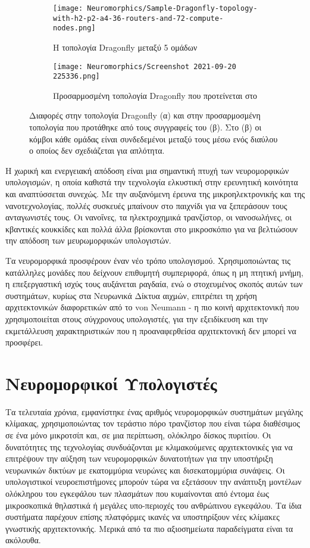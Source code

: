 \documentclass[12pt]{report}
\begin{document}
\begin{figure}
\centering
\begin{subfigure}{.4\textwidth}
  \centering
  \texttt{[image: Neuromorphics/Sample-Dragonfly-topology-with-h2-p2-a4-36-routers-and-72-compute-nodes.png]}
  \caption{Η τοπολογία Dragonfly μεταξύ 5 ομάδων}
  \label{fig:sub1}
\end{subfigure}%
\begin{subfigure}{.6\textwidth}
  \centering
  \texttt{[image: Neuromorphics/Screenshot 2021-09-20 225336.png]}
  \caption{Προσαρμοσμένη τοπολογία Dragonfly που προτείνεται στο \cite{Akbari2017}}
  \label{fig:sub2}
\end{subfigure}
\caption{\small Διαφορές στην τοπολογία Dragonfly (α) και στην προσαρμοσμένη τοπολογία που προτάθηκε από τους συγγραφείς του \cite{Akbari2017} (β). Στο (β) οι κόμβοι κάθε ομάδας είναι συνδεδεμένοι μεταξύ τους μέσω ενός διαύλου ο οποίος δεν σχεδιάζεται για απλότητα.}
\label{fig:test}
\end{figure}


Η χωρική και ενεργειακή απόδοση είναι μια σημαντική πτυχή των νευρομορφικών υπολογισμών, η οποία καθιστά την τεχνολογία ελκυστική στην ερευνητική κοινότητα και αναπτύσσεται συνεχώς. Με την αυξανόμενη έρευνα της μικροηλεκτρονικής και της νανοτεχνολογίας, πολλές συσκευές μπαίνουν στο παιχνίδι για να ξεπεράσουν τους ανταγωνιστές τους. Οι νανοΐνες, τα ηλεκτροχημικά τρανζίστορ, οι νανοσωλήνες, οι κβαντικές κουκκίδες και πολλά άλλα βρίσκονται στο μικροσκόπιο για να βελτιώσουν την απόδοση των μευρωμορφικών υπολογιστών.

Τα νευρομορφικά προσφέρουν έναν νέο τρόπο υπολογισμού. Χρησιμοποιώντας τις κατάλληλες μονάδες που δείχνουν επιθυμητή συμπεριφορά, όπως η μη πτητική μνήμη, η επεξεργαστική ισχύς τους αυξάνεται ραγδαία, ενώ ο στοχευμένος σκοπός αυτών των συστημάτων, κυρίως στα Νευρωνικά Δίκτυα αιχμών, επιτρέπει τη χρήση αρχιτεκτονικών διαφορετικών από το \textlatin{von Neumann}  - η πιο κοινή αρχιτεκτονική που χρησιμοποιείται στους σύγχρονους υπολογιστές, για την εξειδίκευση και την εκμετάλλευση χαρακτηριστικών που η προαναφερθείσα αρχιτεκτονική δεν μπορεί να προσφέρει.

\section{Νευρομορφικοί Υπολογιστές}

Τα τελευταία χρόνια, εμφανίστηκε ένας αριθμός νευρομορφικών συστημάτων μεγάλης κλίμακας, χρησιμοποιώντας τον τεράστιο πόρο τρανζίστορ που είναι τώρα διαθέσιμος σε ένα μόνο μικροτσίπ και, σε μια περίπτωση, ολόκληρο δίσκος πυριτίου. Οι δυνατότητες της τεχνολογίας συνδυάζονται με κλιμακούμενες αρχιτεκτονικές για να επιτρέψουν την αύξηση των νευρομορφικών δυνατοτήτων για την υποστήριξη νευρωνικών δικτύων με εκατομμύρια νευρώνες και δισεκατομμύρια συνάψεις. Οι υπολογιστικοί νευροεπιστήμονες μπορούν τώρα να εξετάσουν την ανάπτυξη μοντέλων ολόκληρου του εγκεφάλου των πλασμάτων που κυμαίνονται από έντομα έως μικροσκοπικά θηλαστικά ή μεγάλες υπο-περιοχές του ανθρώπινου εγκεφάλου. Τα ίδια συστήματα παρέχουν επίσης πλατφόρμες ικανές να υποστηρίξουν νέες κλίμακες γνωστικής αρχιτεκτονικής. Μερικά από τα πιο αξιοσημείωτα παραδείγματα είναι τα ακόλουθα.
\end{document}
